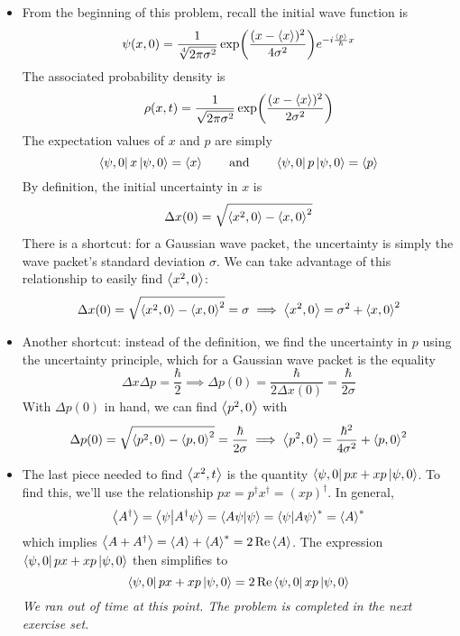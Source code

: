 \documentclass[11pt, a4paper]{article}
\newcommand{\eqtext}[1]{\qquad \text{#1} \qquad}
\newcommand{\evb}[1]{\big \langle {#1} \big \rangle}  %
\newcommand{\bbraket}[2]{\big \langle {#1} \big | {#2} \big \rangle}  %
\begin{document}
\begin{itemize}
	\item From the beginning of this problem, recall the initial wave function is
	\begin{equation*}
		\psi(x, 0) = \frac{1}{\sqrt[4]{2\pi \sigma^{2}}} \exp(\frac{(x - \ev{x})^{2}}{4 \sigma^{2}})e^{-i\frac{\ev{p}}{\hbar}x}
	\end{equation*}
	The associated probability density is 
	\begin{equation*}
		\rho(x, t) = \frac{1}{\sqrt{2\pi \sigma^{2}}} \exp(\frac{(x - \ev{x})^{2}}{2 \sigma^{2}})
	\end{equation*}
	The expectation values of $ x $ and $ p $ are simply
	\begin{equation*}
		\bra{\psi, 0} x \ket{\psi, 0} = \ev{x} \eqtext{and} \bra{\psi, 0} p \ket{\psi, 0} = \ev{p}
	\end{equation*}
	By definition, the initial uncertainty in $ x $ is
	\begin{equation*}
		\Delta x(0) = \sqrt{\ev{x^{2}, 0} - \ev{x, 0}^{2}}
	\end{equation*}
	There is a shortcut: for a Gaussian wave packet, the uncertainty is simply the wave packet's standard deviation $ \sigma $. We can take advantage of this relationship to easily find $ \ev{x^{2}, 0} $:
	\begin{equation*}
		\Delta x(0) = \sqrt{\ev{x^{2}, 0} - \ev{x, 0}^{2}} = \sigma \implies \ev{x^{2}, 0} = \sigma^{2} + \ev{x, 0}^{2}
	\end{equation*}
	
	\item Another shortcut: instead of the definition, we find the uncertainty in $ p $ using the uncertainty principle, which for a Gaussian wave packet is the equality
	\begin{equation*}
		\Delta x \Delta p = \frac{\hbar}{2} \implies \Delta p(0) = \frac{\hbar}{2\Delta x(0)} = \frac{\hbar}{2\sigma}
	\end{equation*}
	With $ \Delta p(0) $ in hand, we can find $ \ev{p^{2}, 0} $ with
	\begin{equation*}
		\Delta p(0) = \sqrt{\ev{p^{2}, 0} - \ev{p, 0}^{2}} = \frac{\hbar}{2\sigma} \implies \ev{p^{2}, 0} = \frac{\hbar^{2}}{4\sigma^{2}} + \ev{p, 0}^{2}
	\end{equation*}
	
	\item The last piece needed to find $ \ev{x^{2}, t} $ is the quantity $ \bra{\psi, 0} px + xp \ket{\psi, 0}  $. To find this, we'll use the relationship $ px = p^{\dagger}x^{\dagger} = (xp)^{\dagger} $. In general,
	\begin{equation*}
		\evb{A^{\dagger}} = \bbraket{\psi}{A^{\dagger}\psi} = \braket{A\psi}{\psi} = \braket{\psi}{A\psi}^{*} = \ev{A}^{*}
	\end{equation*}
	which implies $ \ev{A + A^{\dagger}} = \ev{A} + \ev{A}^{*} = 2 \Re \ev{A} $. The expression $  \bra{\psi, 0} px + xp \ket{\psi, 0}  $ then simplifies to
	\begin{equation*}
		 \bra{\psi, 0} px + xp \ket{\psi, 0}  = 2 \Re \bra{\psi, 0}xp \ket{\psi, 0} 
	\end{equation*}
	\textit{We ran out of time at this point. The problem is completed in the next exercise set.}
	

\end{itemize}
\end{document}
